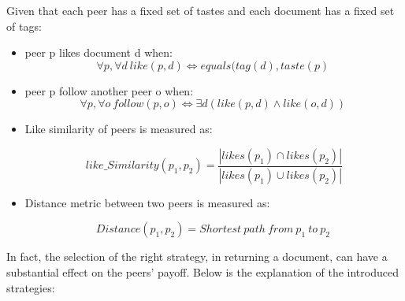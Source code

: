 \documentclass [12pt]{article} \usepackage{multicol}
\begin{document}
Given that each peer has a fixed set of tastes and each document has a fixed set of tags:
\begin{itemize}


\item peer p likes document d when: $$ \forall p, \forall d   \ like(p,d) \Leftrightarrow   equals(tag(d), taste(p)\   $$

	 
\item peer p follow another peer o when: 	 $$  \forall p, \forall o \ follow(p, o) \Leftrightarrow  \exists d  (like(p,d)  \wedge like(o, d)) \ $$


\item Like similarity of peers is measured as:


$$ {like\_Similarity}(p_1,p_2) =  \frac  { |likes(p_1) \cap  likes(p_2)| } {| likes(p_1) \cup likes(p_2)|}    $$


\item Distance metric between two peers is measured as:

$$ Distance(p_1,p_2) =  Shortest\ path\ from \ p_1\ to\ p_2\ $$

\end{itemize}

In fact, the selection of the right strategy, in returning a document, can have a substantial effect on the peers' payoff.
Below is the explanation of the introduced strategies: 
\end{document}
